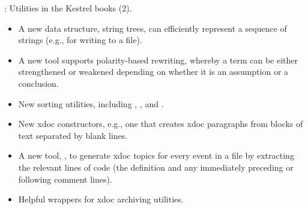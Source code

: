 \begin{frame}

\implibtitle

: Utilities in the Kestrel books (2).

\begin{itemize}

\item A new data structure, string trees, can efficiently represent a
  sequence of strings (e.g., for writing to a file).

\item A new tool supports polarity-based rewriting, whereby a term can
  be either strengthened or weakened depending on whether it is an
  assumption or a conclusion.

\item New sorting utilities, including ,
  , and .

\item New xdoc constructors, e.g., one that creates xdoc paragraphs
  from blocks of text separated by blank lines.

\item A new tool, , to generate xdoc topics
  for every event in a file by extracting the relevant lines of code
  (the definition and any immediately preceding or following comment
  lines).

\item Helpful wrappers for xdoc archiving utilities.

\end{itemize}

\end{frame}



